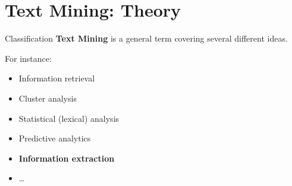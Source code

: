 \documentclass[xcolor=x11names, aspectratio=169]{beamer}
\begin{document}
{ %
    \begin{frame}[plain]
     \end{frame}
}

\section{Text Mining: Theory}%

\begin{frame}{Classification}
\textbf{Text Mining} is a \alert{general term} covering several different ideas.\pause

For instance:
\begin{itemize}[<+->]
\item Information retrieval
\item Cluster analysis
\item Statistical (lexical) analysis
\item Predictive analytics
\item \textbf{Information extraction}
\item\dots
\end{itemize}
\end{frame}
\end{document}
